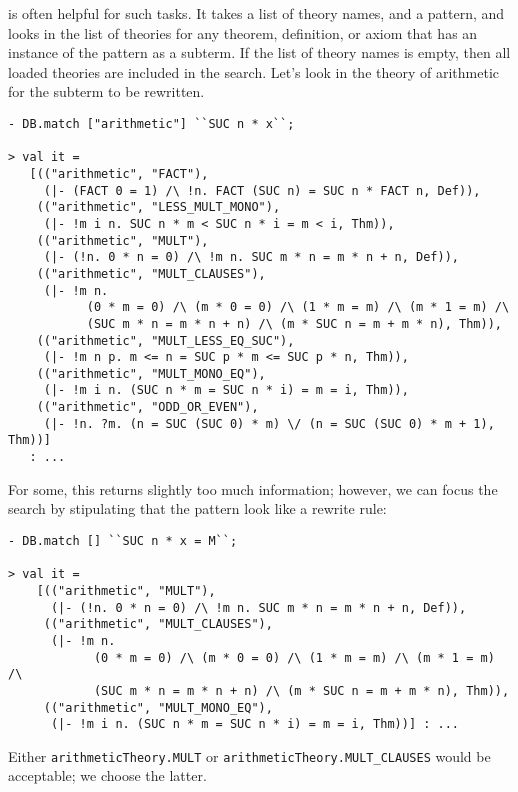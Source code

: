 \noindent
is often helpful for such tasks. It takes a list of theory names, and
a pattern, and looks in the list of theories for any theorem,
definition, or axiom that has an instance of the pattern as a subterm.
If the list of theory names is empty, then all loaded theories are
included in the search. Let's look in the theory of arithmetic for the
subterm to be rewritten.

\begin{session}
\begin{verbatim}
- DB.match ["arithmetic"] ``SUC n * x``;

> val it =
   [(("arithmetic", "FACT"),
     (|- (FACT 0 = 1) /\ !n. FACT (SUC n) = SUC n * FACT n, Def)),
    (("arithmetic", "LESS_MULT_MONO"),
     (|- !m i n. SUC n * m < SUC n * i = m < i, Thm)),
    (("arithmetic", "MULT"),
     (|- (!n. 0 * n = 0) /\ !m n. SUC m * n = m * n + n, Def)),
    (("arithmetic", "MULT_CLAUSES"),
     (|- !m n.
           (0 * m = 0) /\ (m * 0 = 0) /\ (1 * m = m) /\ (m * 1 = m) /\
           (SUC m * n = m * n + n) /\ (m * SUC n = m + m * n), Thm)),
    (("arithmetic", "MULT_LESS_EQ_SUC"),
     (|- !m n p. m <= n = SUC p * m <= SUC p * n, Thm)),
    (("arithmetic", "MULT_MONO_EQ"),
     (|- !m i n. (SUC n * m = SUC n * i) = m = i, Thm)),
    (("arithmetic", "ODD_OR_EVEN"),
     (|- !n. ?m. (n = SUC (SUC 0) * m) \/ (n = SUC (SUC 0) * m + 1), Thm))]
   : ...
\end{verbatim}
\end{session}

For some, this returns slightly too much information; however, we can
focus the search by stipulating that the pattern look like a rewrite
rule:

\begin{session}
\begin{verbatim}
- DB.match [] ``SUC n * x = M``;

> val it =
    [(("arithmetic", "MULT"),
      (|- (!n. 0 * n = 0) /\ !m n. SUC m * n = m * n + n, Def)),
     (("arithmetic", "MULT_CLAUSES"),
      (|- !m n.
            (0 * m = 0) /\ (m * 0 = 0) /\ (1 * m = m) /\ (m * 1 = m) /\
            (SUC m * n = m * n + n) /\ (m * SUC n = m + m * n), Thm)),
     (("arithmetic", "MULT_MONO_EQ"),
      (|- !m i n. (SUC n * m = SUC n * i) = m = i, Thm))] : ...
\end{verbatim}
\end{session}

Either {\small\verb+arithmeticTheory.MULT+} or
{\small\verb+arithmeticTheory.MULT_CLAUSES+} would be acceptable; we
choose the latter.

